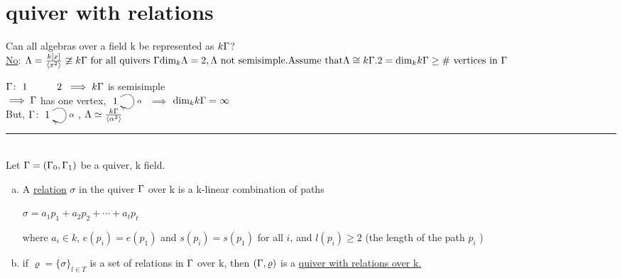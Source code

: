 
\section{quiver with relations}
Can all algebras over a field k be represented as $k\Gamma$?\\\newline
\underline{No}: 
$\Lambda = \frac{k[x]}{\langle x^2\rangle} \ncong k\G \text{ for all quivers }\G
\text{dim}_{k}\Lambda = 2, \Lambda\text{ not semisimple}.\\\newline \text{Assume that}  \Lambda \cong k\G.\\
2= \text{dim}_kk\G \ge \text{\# vertices in } \G $

$ \G \colon \xymatrix{1& 2} \implies k\G$ is semisimple \blitza\\
$\implies \Gamma$ has one vertex, $\xymatrix{1\ar@(ur,dr)^\alpha} $ $\implies$ $\text{dim}_kk\Gamma = \infty$ \blitza\\
\newline But, $\G\colon \xymatrix{1 \ar@(ur,dr)^\alpha}$, $\Lambda \simeq \frac{k\Gamma}{\langle \alpha^2\rangle} $\\
\rule{\textwidth}{1pt}\\
Let $\Gamma=(\Gamma_0,\Gamma_1)$ be a quiver, k field.\\
\begin{defin}
\begin{enumerate}[(a)]
	~\\ \item A \underline{relation} $\sigma$ in the quiver $\Gamma$ over k is a k-linear combination of paths
	\begin{center}
		$\sigma = a_1p_1 + a_2p_2+ \cdots + a_tp_t$\\
	\end{center}
	where $a_i\in k$, $e(p_i)=e(p_1)$ and $s(p_i)=s(p_1)$ for all $i$, and $l(p_i)\geq 2$ (the length of the path $p_i$ )
	\item if $\varrho = \{\sigma\}_{l \in T}$ is a set of relations in $\Gamma$ over k, then $(\Gamma,\varrho)$ is a \underline{quiver with relations over k.}  
\end{enumerate}
\end{defin}
